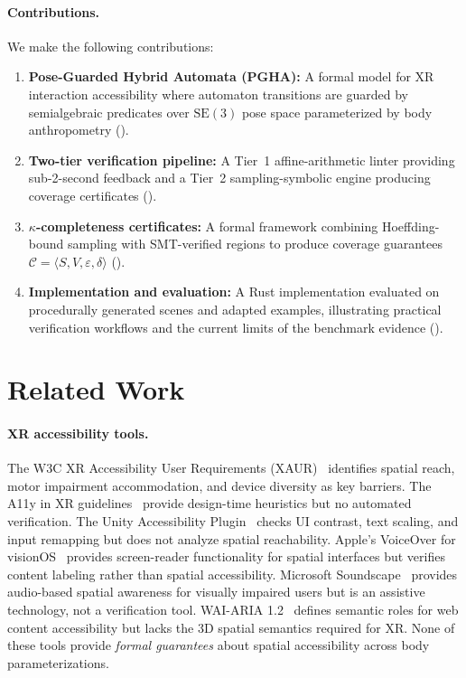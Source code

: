 \documentclass[11pt,letterpaper]{article}
\newcommand{\SE}{\mathrm{SE}(3)}
\newcommand{\eps}{\varepsilon}
\newcommand{\cert}{\mathcal{C}}
\begin{document}
\paragraph{Contributions.}
We make the following contributions:
\begin{enumerate}[leftmargin=*,nosep]
  \item \textbf{Pose-Guarded Hybrid Automata (PGHA):} A formal model for XR interaction accessibility where automaton transitions are guarded by semialgebraic predicates over $\SE$ pose space parameterized by body anthropometry ().
  \item \textbf{Two-tier verification pipeline:} A Tier~1 affine-arithmetic linter providing sub-2-second feedback and a Tier~2 sampling-symbolic engine producing coverage certificates ().
  \item \textbf{$\kappa$-completeness certificates:} A formal framework combining Hoeffding-bound sampling with SMT-verified regions to produce coverage guarantees $\cert = \langle S, V, \eps, \delta \rangle$ ().
  \item \textbf{Implementation and evaluation:} A Rust implementation evaluated on procedurally generated scenes and adapted examples, illustrating practical verification workflows and the current limits of the benchmark evidence ().
\end{enumerate}

\section{Related Work}
\label{sec:related}

\paragraph{XR accessibility tools.}
The W3C XR Accessibility User Requirements (XAUR)~\cite{w3c-xaur} identifies spatial reach, motor impairment accommodation, and device diversity as key barriers.
The A11y in XR guidelines~\cite{a11y-xr} provide design-time heuristics but no automated verification.
The Unity Accessibility Plugin~\cite{unity-a11y} checks UI contrast, text scaling, and input remapping but does not analyze spatial reachability.
Apple's VoiceOver for visionOS~\cite{apple-voiceover} provides screen-reader functionality for spatial interfaces but verifies content labeling rather than spatial accessibility.
Microsoft Soundscape~\cite{ms-soundscape} provides audio-based spatial awareness for visually impaired users but is an assistive technology, not a verification tool.
WAI-ARIA 1.2~\cite{wai-aria} defines semantic roles for web content accessibility but lacks the 3D spatial semantics required for XR.
None of these tools provide \emph{formal guarantees} about spatial accessibility across body parameterizations.
\end{document}
